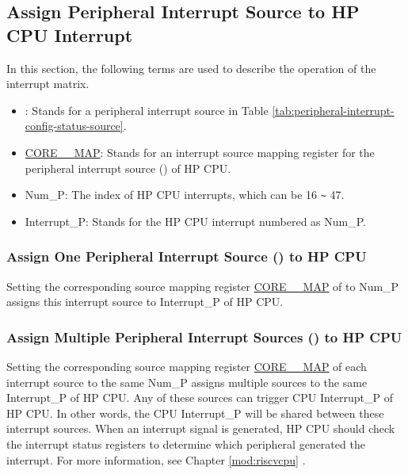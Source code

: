\documentclass[main\_\_EN.tex]{subfiles}
\begin{document}
\clearpage
\begin{landscape}

\end{landscape}
\restoregeometry
\clearpage


\subsection{Assign Peripheral Interrupt Source to HP CPU Interrupt}

In this section, the following terms are used to describe the operation of the interrupt matrix.

\begin{itemize}

\item {}: Stands for a peripheral interrupt source in Table \ref{tab:peripheral-interrupt-config-status-source}.
\item \hyperref[fielddesc:CORE0SOURCEMAP]{CORE\_\_MAP}: Stands for an interrupt source mapping register for the peripheral interrupt source () of HP CPU.
\item Num\_P: The index of HP CPU interrupts, which can be 16 \verb+~+ 47.
\item Interrupt\_P: Stands for the HP CPU interrupt numbered as Num\_P.

\end{itemize}

\subsubsection{Assign One Peripheral Interrupt Source () to HP CPU}

Setting the corresponding source mapping register \hyperref[fielddesc:CORE0SOURCEMAP]{CORE\_\_MAP} of  to Num\_P assigns this interrupt source to Interrupt\_P of HP CPU.

\subsubsection{Assign Multiple Peripheral Interrupt Sources () to HP CPU}

Setting the corresponding source mapping register \hyperref[fielddesc:CORE0SOURCEMAP]{CORE\_\_MAP} of each interrupt source to the same Num\_P assigns multiple sources to the same Interrupt\_P of HP CPU. Any of these sources can trigger CPU Interrupt\_P of HP CPU. In other words, the CPU Interrupt\_P will be shared between these interrupt sources. When an interrupt signal is generated, HP CPU should check the interrupt status registers to determine which peripheral generated the interrupt. For more information, see Chapter \ref{mod:riscvcpu} \textit{}.
\end{document}

